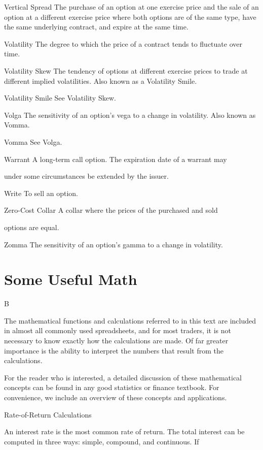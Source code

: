 Vertical Spread The purchase of an option at one exercise price and the sale of an option at a different exercise price where both options are of the same type, have the same underlying contract, and expire at the same time.\par
Volatility The degree to which the price of a contract tends to fluctuate over time.\par
Volatility Skew The tendency of options at different exercise prices to trade at different implied volatilities. Also known as a Volatility Smile.\par
Volatility Smile See Volatility Skew.\par
Volga The sensitivity of an option's vega to a change in volatility. Also known as Vomma.\par
Vomma See Volga.\par
Warrant A long-term call option. The expiration date of a warrant may\par
under some circumstances be extended by the issuer.\par
Write To sell an option.\par
Zero-Cost Collar A collar where the prices of the purchased and sold\par
options are equal.\par
Zomma The sensitivity of an option's gamma to a change in volatility.\par

\chapter{Some Useful Math}

\noindent B\par
The mathematical functions and calculations referred to in this text are included in almost all commonly used spreadsheets, and for most traders, it is not necessary to know exactly how the calculations are made. Of far greater importance is the ability to interpret the numbers that result from the calculations.\par
For the reader who is interested, a detailed discussion of these mathematical concepts can be found in any good statistics or finance textbook. For convenience, we include an overview of these concepts and applications.\par
\noindent Rate-of-Return Calculations\par
An interest rate is the most common rate of return. The total interest can be computed in three ways: simple, compound, and continuous. If\par

